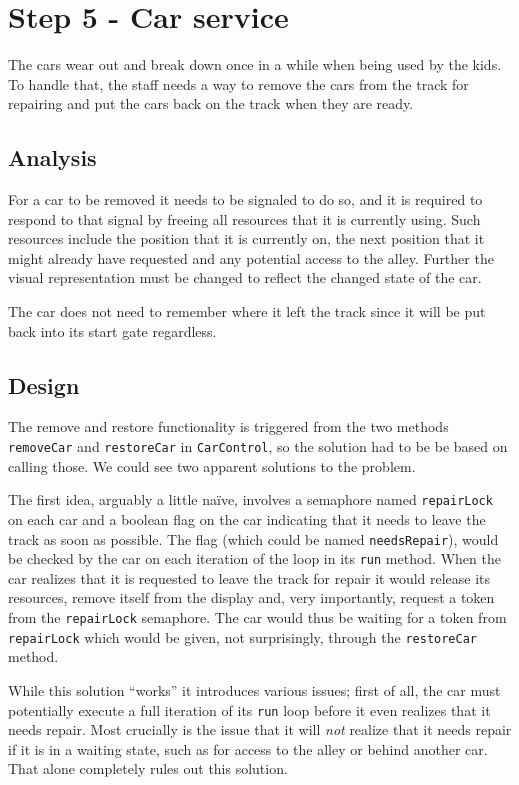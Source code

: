 \section*{Step 5 - Car service}

The cars wear out and break down once in a while when being used by the kids. To handle that, the staff needs a way to remove the cars from the track for repairing and put the cars back on the track when they are ready.

\subsection*{Analysis}

For a car to be removed it needs to be signaled to do so, and it is required to respond to that signal by freeing all resources that it is currently using. Such resources include the position that it is currently on, the next position that it might already have requested and any potential access to the alley. Further the visual representation must be changed to reflect the changed state of the car.

The car does not need to remember where it left the track since it will be put back into its start gate regardless.

\subsection*{Design}

The remove and restore functionality is triggered from the two methods \texttt{removeCar} and \texttt{restoreCar} in \texttt{CarControl}, so the solution had to be be based on calling those. We could see two apparent solutions to the problem.

The first idea, arguably a little na\"ive, involves a semaphore named \texttt{repairLock} on each car and a boolean flag on the car indicating that it needs to leave the track as soon as possible. The flag (which could be named \texttt{needsRepair}), would be checked by the car on each iteration of the loop in its \texttt{run} method. When the car realizes that it is requested to leave the track for repair it would release its resources, remove itself from the display and, very importantly, request a token from the \texttt{repairLock} semaphore. The car would thus be waiting for a token from \texttt{repairLock} which would be given, not surprisingly, through the \texttt{restoreCar} method.

While this solution ``works'' it introduces various issues; first of all, the car must potentially execute a full iteration of its \texttt{run} loop before it even realizes that it needs repair. Most crucially is the issue that it will \emph{not} realize that it needs repair if it is in a waiting state, such as for access to the alley or behind another car. That alone completely rules out this solution.


